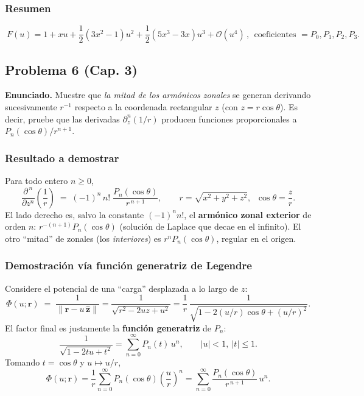\documentclass{article}
\begin{document}
\subsubsection*{Resumen}
\[
\boxed{\
F(u)=1+xu+\frac{1}{2}(3x^{2}-1)u^{2}+\frac{1}{2}(5x^{3}-3x)u^{3}+\mathcal O(u^{4})\,,\ \ 
\text{coeficientes }=P_0,P_1,P_2,P_3.\
}
\]


\subsection{Problema 6 (Cap. 3)} \vspace{0.5cm}

\textbf{Enunciado.} Muestre que \emph{la mitad de los armónicos zonales} se generan derivando sucesivamente $r^{-1}$ respecto a la coordenada rectangular $z$ (con $z=r\cos\theta$). Es decir, pruebe que las derivadas $\partial_z^n (1/r)$ producen funciones proporcionales a $P_n(\cos\theta)/r^{n+1}$.

\subsubsection*{Resultado a demostrar}
Para todo entero $n\ge 0$,
\[
\boxed{\quad
\frac{\partial^{\,n}}{\partial z^{n}}\!\left(\frac{1}{r}\right)
\;=\;(-1)^{n}\,n!\;\frac{P_n(\cos\theta)}{r^{\,n+1}},
\qquad r=\sqrt{x^2+y^2+z^2},\;\; \cos\theta=\frac{z}{r}.
\quad}
\]
El lado derecho es, salvo la constante $(-1)^n n!$, el \textbf{armónico zonal exterior} de orden $n$: $r^{-(n+1)}P_n(\cos\theta)$ (solución de Laplace que decae en el infinito). El otro “mitad” de zonales (los \emph{interiores}) es $r^{n}P_n(\cos\theta)$, regular en el origen.

\subsubsection*{Demostración vía función generatriz de Legendre}
Considere el potencial de una “carga” desplazada a lo largo de $z$:
\[
\Phi(u;\mathbf r)\;=\;\frac{1}{\big\lVert \mathbf r - u\,\hat{\mathbf z}\big\rVert}
=\frac{1}{\sqrt{r^{2}-2uz+u^{2}}}
=\frac{1}{r}\,\frac{1}{\sqrt{1-2(u/r)\cos\theta+(u/r)^{2}}}.
\]
El factor final es justamente la \textbf{función generatriz} de $P_n$:
\[
\frac{1}{\sqrt{1-2tu+t^{2}}}=\sum_{n=0}^{\infty}P_n(t)\,u^{n},\qquad |u|<1,\ |t|\le 1.
\]
Tomando $t=\cos\theta$ y $u\mapsto u/r$,
\[
\Phi(u;\mathbf r)
=\frac{1}{r}\sum_{n=0}^{\infty}P_n(\cos\theta)\left(\frac{u}{r}\right)^{\!n}
=\sum_{n=0}^{\infty}\frac{P_n(\cos\theta)}{r^{\,n+1}}\,u^{n}.
\tag{$\ast$}
\]
\end{document}
